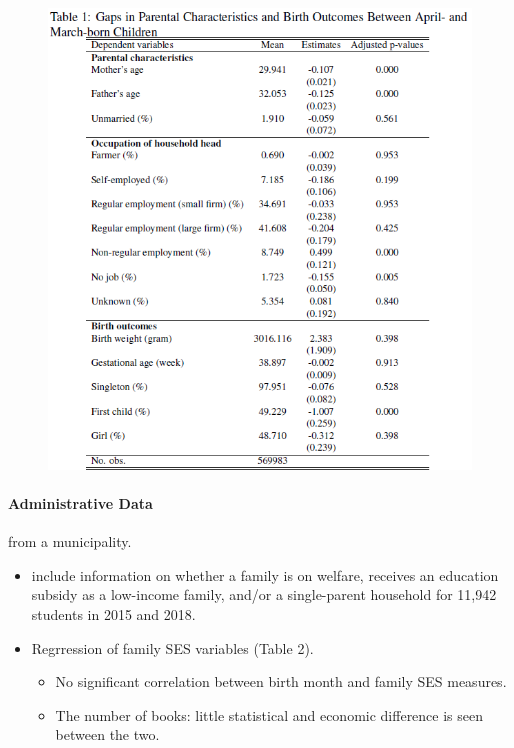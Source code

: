 \documentclass[../root]{subfiles}
\begin{document}
\begin{itemize}
\begin{figure}[ht]
        \includegraphics[scale = 1]{0904tanji/T1}
      \end{figure}
    \end{itemize}

    \paragraph{Administrative Data}from a municipality.

    \begin{itemize}
      \item include information on whether a family is on welfare, receives an education subsidy as a low-income family, and/or a single-parent household for 11,942 students in 2015 and 2018.
      \item Regrression of family SES variables (Table 2).
      \begin{itemize}
        \item No significant correlation between birth month and family SES measures.
        \item The number of books: little statistical and economic difference is seen between the two.
      \end{itemize}
    \end{itemize}
\end{document}
